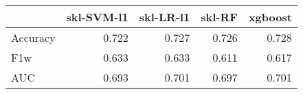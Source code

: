 \begin{tabular}{lrrrr}
\toprule
{} &  skl-SVM-l1 &  skl-LR-l1 &  skl-RF &  xgboost \\
\midrule
Accuracy &       0.722 &      0.727 &   0.726 &    0.728 \\
F1w      &       0.633 &      0.633 &   0.611 &    0.617 \\
AUC      &       0.693 &      0.701 &   0.697 &    0.701 \\
\bottomrule
\end{tabular}
